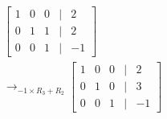 \documentclass[preview]{standalone}
\begin{document}
\begin{align*}
\begin{bmatrix} 1 & 0 & 0 & | & 2 \\ 0 & 1 & 1 & | & 2 \\ 0 & 0 & 1 & | & -1 \end{bmatrix}\\ \rightarrow_{-1\times R_3 + R_2} \begin{bmatrix} 1 & 0 & 0 & | & 2 \\ 0 & 1 & 0 & | & 3 \\ 0 & 0 & 1 & | & -1 \end{bmatrix}
\end{align*}
\end{document}
